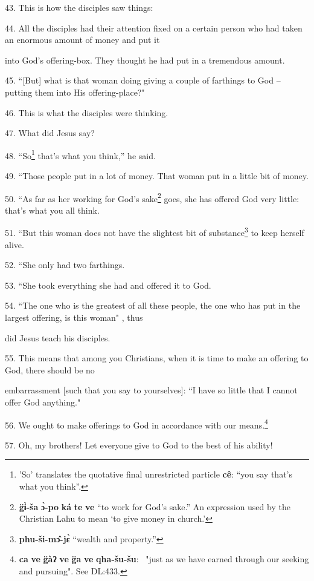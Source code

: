 43. This is how the disciples saw things:

44. All the disciples had their attention fixed on a certain person who had taken
an enormous amount of money and put it

into God's offering-box. They thought he had put in a tremendous amount.

45. ``[But] what is that woman doing giving a couple of farthings to God
-- putting them into His offering-place?"

46. This is what the disciples were thinking.

47. What did Jesus say?

48. ``So\footnote{'So' translates the quotative final unrestricted particle \textbf{cê}: ``you say that's what you think''.} that's what you think,'' he said.

49. ``Those people put in a lot of money. That woman put in a little bit
of money.

50. ``As far as her working for God's sake\footnote{\textbf{g̈ɨ̀-ša} \textbf{ɔ̀-po} \textbf{ká} \textbf{te} \textbf{ve} ``to work for God's sake.'' An expression used by the Christian Lahu to mean `to give money in church.'} goes, she has offered God
very little: that's what you all think.

51. ``But this woman does not have the slightest bit of substance\footnote{\textbf{phu-ši-mɔ̂-jɛ̀} ``wealth and property.''} to
keep herself alive.

52. ``She only had two farthings.

53. ``She took everything she had and offered it to God.

54. ``The one who is the greatest of all these people, the one who has put
in the largest offering, is this woman" , thus

did Jesus teach his disciples.

55. This means that among you Christians, when it is time to make an offering to
God, there should be no

embarrassment [such that you say to yourselves]: ``I have so little that
I cannot offer God anything."

56. We ought to make offerings to God in accordance with our means.\footnote{\textbf{ca} \textbf{ve} \textbf{g̈àʔ} \textbf{ve} \textbf{g̈a} \textbf{ve} \textbf{qha-šu-šu}: ~"just as we have earned through our seeking and pursuing". See DL:433.}

57. Oh, my brothers! Let everyone give to God to the best of his ability!

